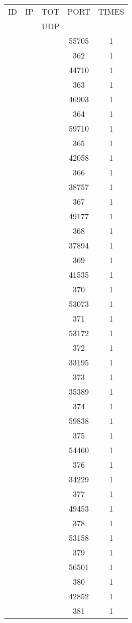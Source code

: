 \documentclass[a4paper]{scrartcl}
\begin{document}
\begin{minipage}[b]{0.5\linewidth}
\begin{tabular}{| c | c | c | c | c |}
\hline
ID & IP & TOT & PORT & TIMES \\ 
   &    & UDP &      &       \\ 
\hline
& & & 55705 & 1 \\ & & & 362 & 1 \\ & & & 44710 & 1 \\ & & & 363 & 1 \\ & & & 46903 & 1 \\ & & & 364 & 1 \\ & & & 59710 & 1 \\ & & & 365 & 1 \\ & & & 42058 & 1 \\ & & & 366 & 1 \\ & & & 38757 & 1 \\ & & & 367 & 1 \\ & & & 49177 & 1 \\ & & & 368 & 1 \\ & & & 37894 & 1 \\ & & & 369 & 1 \\ & & & 41535 & 1 \\ & & & 370 & 1 \\ & & & 53073 & 1 \\ & & & 371 & 1 \\ & & & 53172 & 1 \\ & & & 372 & 1 \\ & & & 33195 & 1 \\ & & & 373 & 1 \\ & & & 35389 & 1 \\ & & & 374 & 1 \\ & & & 59838 & 1 \\ & & & 375 & 1 \\ & & & 54460 & 1 \\ & & & 376 & 1 \\ & & & 34229 & 1 \\ & & & 377 & 1 \\ & & & 49453 & 1 \\ & & & 378 & 1 \\ & & & 53158 & 1 \\ & & & 379 & 1 \\ & & & 56501 & 1 \\ & & & 380 & 1 \\ & & & 42852 & 1 \\ & & & 381 & 1 \\ \hline\end{tabular}\end{minipage} \hfill\begin{minipage}[b]{0.5\linewidth}\begin{tabular}{| c | c | c | c | c |}

\end{tabular}
\end{minipage}
\end{document}
